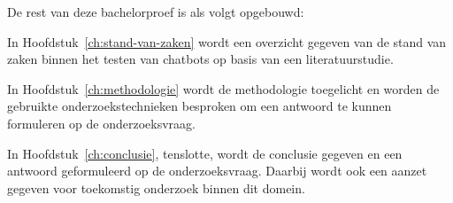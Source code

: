 De rest van deze bachelorproef is als volgt opgebouwd:

In Hoofdstuk~\ref{ch:stand-van-zaken} wordt een overzicht gegeven van de stand
van zaken binnen het testen van chatbots op basis van een literatuurstudie.

In Hoofdstuk~\ref{ch:methodologie} wordt de methodologie toegelicht en worden de
gebruikte onderzoekstechnieken besproken om een antwoord te kunnen formuleren op
de onderzoeksvraag.


In Hoofdstuk~\ref{ch:conclusie}, tenslotte, wordt de conclusie gegeven en een
antwoord geformuleerd op de onderzoeksvraag. Daarbij wordt ook een aanzet
gegeven voor toekomstig onderzoek binnen dit domein.



